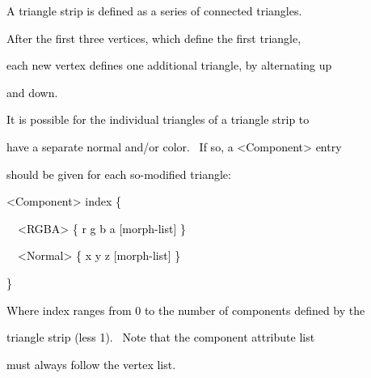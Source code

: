 \documentclass[a4paper]{article}
\newcommand\textstyleOOoComputerKeyWord[1]{\textrm{\textcolor[rgb]{0.0,0.0,0.5019608}{#1}}}
\begin{document}
\bigskip

{\color{black}
\textstyleOOoComputerKeyWord{\textcolor{black}{\ \ A triangle strip is defined as a series of connected triangles.}}}

{\color{black}
\textstyleOOoComputerKeyWord{\textcolor{black}{\ \ After the first three vertices, which define the first triangle,}}}

{\color{black}
\textstyleOOoComputerKeyWord{\textcolor{black}{\ \ each new vertex defines one additional triangle, by alternating up}}}

{\color{black}
\textstyleOOoComputerKeyWord{\textcolor{black}{\ \ and down.}}}


\bigskip

{\color{black}
\textstyleOOoComputerKeyWord{\textcolor{black}{\ \ It is possible for the individual triangles of a triangle strip to}}}

{\color{black}
\textstyleOOoComputerKeyWord{\textcolor{black}{\ \ have a separate normal and/or color. \ If so, a
{\textless}Component{\textgreater} entry}}}

{\color{black}
\textstyleOOoComputerKeyWord{\textcolor{black}{\ \ should be given for each so-modified triangle:}}}


\bigskip

{\color{black}
\textstyleOOoComputerKeyWord{\textcolor{black}{\ \ {\textless}Component{\textgreater} index \{}}}

{\color{black}
\textstyleOOoComputerKeyWord{\textcolor{black}{\ \ \ \ {\textless}RGBA{\textgreater} \{ r g b a [morph-list] \}}}}

\clearpage
\bigskip

{\color{black}
\textstyleOOoComputerKeyWord{\textcolor{black}{\ \ \ \ {\textless}Normal{\textgreater} \{ x y z [morph-list] \}}}}

{\color{black}
\textstyleOOoComputerKeyWord{\textcolor{black}{\ \ \}}}}


\bigskip

{\color{black}
\textstyleOOoComputerKeyWord{\textcolor{black}{\ \ Where index ranges from 0 to the number of components defined by
the}}}

{\color{black}
\textstyleOOoComputerKeyWord{\textcolor{black}{\ \ triangle strip (less 1). \ Note that the component attribute list}}}

{\color{black}
\textstyleOOoComputerKeyWord{\textcolor{black}{\ \ must always follow the vertex list.}}}


\bigskip
\end{document}
